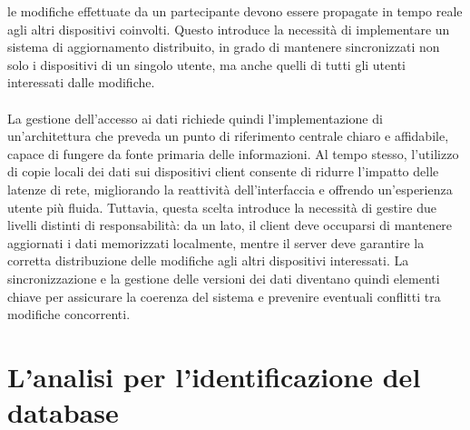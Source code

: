 le modifiche effettuate da un partecipante devono essere propagate
in tempo reale agli altri dispositivi coinvolti. 
Questo introduce la necessità di implementare un sistema di aggiornamento distribuito, 
in grado di mantenere sincronizzati non solo i dispositivi di un singolo utente, 
ma anche quelli di tutti gli utenti interessati dalle modifiche.\\
\\
La gestione dell’accesso ai dati richiede quindi l’implementazione di un’architettura che preveda 
un punto di riferimento centrale chiaro e affidabile, 
capace di fungere da fonte primaria delle informazioni. 
Al tempo stesso, l’utilizzo di copie locali dei dati sui dispositivi client 
consente di ridurre l’impatto delle latenze di rete, 
migliorando la reattività dell’interfaccia e offrendo un’esperienza utente più fluida.
Tuttavia, questa scelta introduce la necessità di gestire due livelli distinti di responsabilità: 
da un lato, il client deve occuparsi di mantenere aggiornati i dati memorizzati localmente, 
mentre il server deve garantire la corretta distribuzione delle modifiche agli altri dispositivi interessati. 
La sincronizzazione e la gestione delle versioni dei dati diventano quindi 
elementi chiave per assicurare la coerenza del sistema e 
prevenire eventuali conflitti tra modifiche concorrenti.

\clearpage
\section{L'analisi per l'identificazione del database}

